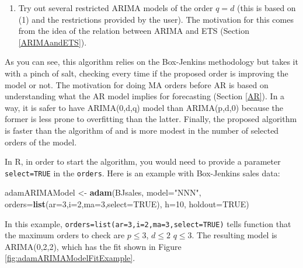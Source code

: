 \documentclass[]{book}
\newenvironment{Shaded}{\begin{snugshade}}{\end{snugshade}}
\newcommand{\DataTypeTok}[1]{\textcolor[rgb]{0.13,0.29,0.53}{#1}}
\newcommand{\DecValTok}[1]{\textcolor[rgb]{0.00,0.00,0.81}{#1}}
\newcommand{\KeywordTok}[1]{\textcolor[rgb]{0.13,0.29,0.53}{\textbf{#1}}}
\newcommand{\NormalTok}[1]{#1}
\newcommand{\OtherTok}[1]{\textcolor[rgb]{0.56,0.35,0.01}{#1}}
\newcommand{\StringTok}[1]{\textcolor[rgb]{0.31,0.60,0.02}{#1}}
\providecommand{\tightlist}{%
  \setlength{\itemsep}{0pt}\setlength{\parskip}{0pt}}
\theoremstyle{definition}
\theoremstyle{definition}
\theoremstyle{definition}
\theoremstyle{definition}
\theoremstyle{remark}
\begin{document}
\begin{enumerate}
\def\labelenumi{\arabic{enumi}.}
\setcounter{enumi}{2}
\tightlist
\item
  Try out several restricted ARIMA models of the order \(q=d\) (this is based on (1) and the restrictions provided by the user). The motivation for this comes from the idea of the relation between ARIMA and ETS (Section \ref{ARIMAandETS}).
\end{enumerate}

As you can see, this algorithm relies on the Box-Jenkins methodology but takes it with a pinch of salt, checking every time if the proposed order is improving the model or not. The motivation for doing MA orders before AR is based on understanding what the AR model implies for forecasting (Section \ref{AR}). In a way, it is safer to have ARIMA(0,d,q) model than ARIMA(p,d,0) because the former is less prone to overfitting than the latter. Finally, the proposed algorithm is faster than the algorithm of \citet{Svetunkov2019} and is more modest in the number of selected orders of the model.

In R, in order to start the algorithm, you would need to provide a parameter \texttt{select=TRUE} in the \texttt{orders}. Here is an example with Box-Jenkins sales data:

\begin{Shaded}
\begin{Highlighting}[]
\NormalTok{adamARIMAModel <-}\StringTok{ }\KeywordTok{adam}\NormalTok{(BJsales, }\DataTypeTok{model=}\StringTok{"NNN"}\NormalTok{,}
                       \DataTypeTok{orders=}\KeywordTok{list}\NormalTok{(}\DataTypeTok{ar=}\DecValTok{3}\NormalTok{,}\DataTypeTok{i=}\DecValTok{2}\NormalTok{,}\DataTypeTok{ma=}\DecValTok{3}\NormalTok{,}\DataTypeTok{select=}\OtherTok{TRUE}\NormalTok{),}
                       \DataTypeTok{h=}\DecValTok{10}\NormalTok{, }\DataTypeTok{holdout=}\OtherTok{TRUE}\NormalTok{)}
\end{Highlighting}
\end{Shaded}

In this example, \texttt{orders=list(ar=3,i=2,ma=3,select=TRUE)} tells function that the maximum orders to check are \(p\leq 3\), \(d\leq 2\) \(q\leq 3\). The resulting model is ARIMA(0,2,2), which has the fit shown in Figure \ref{fig:adamARIMAModelFitExample}.
\end{document}
